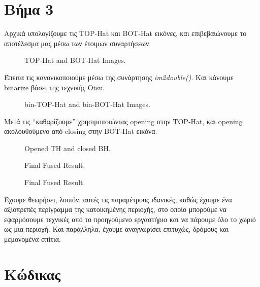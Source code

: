 \documentclass[11pt]{scrartcl} %
\begin{document}
\section{Βήμα 3}

Αρχικά υπολογίζουμε τις TOP-Hat και BOT-Hat εικόνες, και επιβεβαιώνουμε το αποτέλεσμα μας μέσω των έτοιμων συναρτήσεων.

\begin{figure}[h]
    \centering
    \caption{TOP-Hat and BOT-Hat Images.}
\end{figure}

\clearpage
Έπειτα τις κανονικοποιούμε μέσω της συνάρτησης \textit{im2double()}. Και κάνουμε binarize βάσει της τεχνικής Otsu.

\begin{figure}[h]
    \centering
    \caption{bin-TOP-Hat and bin-BOT-Hat Images.}
\end{figure}

\clearpage
Μετά τις ``καθαρίζουμε'' χρησιμοποιώντας opening στην TOP-Hat, και opening ακολουθούμενο από closing στην BOT-Hat εικόνα.
\begin{figure}[h]
    \centering
    \caption{Opened TH and closed BH.}
\end{figure}

\begin{figure}[h]
    \centering
    \caption{Final Fused Result.}
\end{figure}

\begin{figure}[h]
    \centering
    \caption{Final Fused Result.}
\end{figure}

\clearpage
Έχουμε θεωρήσει, λοιπόν, αυτές τις παραμέτρους ιδανικές, καθώς έχουμε ένα αξιοπρεπές περίγραμμα της κατοικημένης περιοχής,
στο οποίο μπορούμε να εφαρμόσουμε τεχνικές από το προηγούμενο εργαστήριο και να πάρουμε όλο το χωριό ως μια περιοχή. Και παράλληλα,
έχουμε αναγνωρίσει επιτυχώς, δρόμους και μεμονομένα σπίτια.

\section{Κώδικας}
\end{document}
